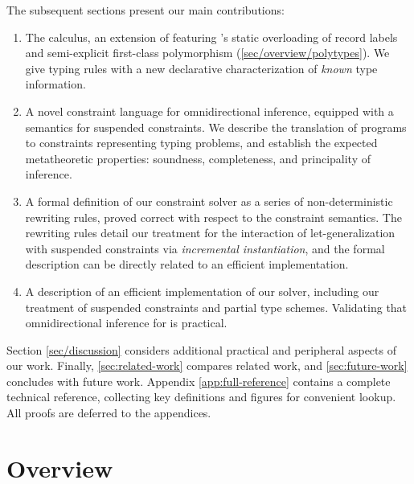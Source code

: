 \documentclass[acmsmall,screen,nonacm%
\Anonymous{,anonymous}{}%
\Final{}{,review}%
]{acmart}
\begin{document}
The subsequent sections present our main contributions:
\begin{enumerate}

  \item[(\cref{sec/oml})]

    The \OML calculus, an extension of \ML featuring \OCaml's static
    overloading of record labels and semi-explicit first-class polymorphism
    (\cref{sec/overview/polytypes}).
    We give typing rules with a new declarative
    characterization of \emph{known} type information.

  \item[(\cref{sec:constraints})]

    A novel constraint language for omnidirectional inference, equipped with a
    semantics for suspended constraints.
    We describe the translation of \OML programs to constraints
    representing typing problems, and establish the expected metatheoretic
    properties: soundness, completeness, and principality of inference.

  \item[(\cref{sec:solving})]

    A formal definition of our constraint solver as a series of
    non-deterministic rewriting rules, proved correct with respect to
    the constraint semantics. The rewriting rules detail our treatment
    for the interaction of let-generalization with suspended
    constraints via \emph{incremental instantiation}, and the formal
    description can be directly related to an efficient
    implementation.

  \item[(\cref{sec:implementation})]

    A description of an efficient implementation of our solver, including our
    treatment of suspended constraints and partial type schemes. Validating
    that omnidirectional inference for \ML is practical.

\end{enumerate}
Section \cref{sec/discussion} considers additional practical and peripheral
aspects of our work. Finally, \cref{sec:related-work} compares related work,
and \cref{sec:future-work} concludes with future work. Appendix
\cref{app:full-reference} contains a complete technical reference, collecting
key definitions and figures for convenient lookup. All proofs are deferred to
the appendices.

\section{Overview}
\label{sec/overview}
\end{document}
